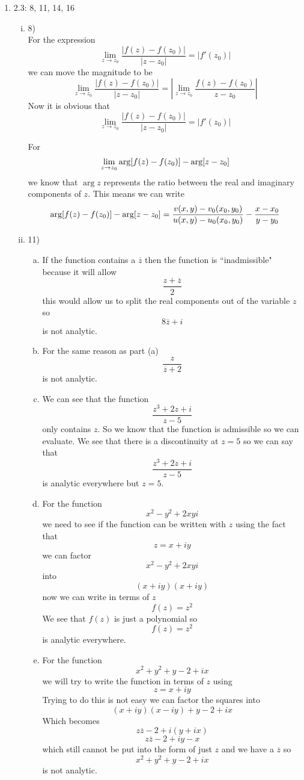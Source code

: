 \documentclass[11pt]{article}
\newcommand{\zbar}{\overline{z}}
\newcommand{\Arg}{\textnormal{arg}}
\begin{document}
\begin{enumerate}
\item 2.3:  8, 11, 14, 16
\begin{enumerate}[(i)]
\item 8)\\
For the expression
$$\lim_{z\rightarrow z_0}\frac{|f(z)-f(z_0)|}{|z-z_0|} = |f'(z_0)|$$
we can move the magnitude to be
$$\lim_{z\rightarrow z_0}\frac{|f(z)-f(z_0)|}{|z-z_0|} = \left|\lim_{z\rightarrow z_0}\frac{f(z)-f(z_0)}{z-z_0}\right|$$
Now it is obvious that 
$$\lim_{z\rightarrow z_0}\frac{|f(z)-f(z_0)|}{|z-z_0|} = |f'(z_0)|$$

For
$$\lim_{z\rightarrow z_0} \Arg[f(z) - f(z_0)] -\Arg[z -z_0]$$
we know that $\arg z$ represents the ratio between the real and imaginary components of $z$. This means we can write
$$\Arg[f(z) - f(z_0)] -\Arg[z-z_0]= \frac{v(x,y) - v_0(x_0,y_0)}{u(x,y) - u_0(x_0,y_0)} -\frac{x -x_0}{y-y_0}$$
\item 11)
\begin{enumerate}[(a)]
\item
If the function contains a $\zbar$ then the function is ``inadmissible" because it will allow $$\frac{z+\zbar}{2}$$
this would allow us to split the real components out of the variable $z$ so
$$8\zbar +i$$
is not analytic.
\item
For the same reason as part (a) 
$$\frac{z}{\zbar + 2}$$
is not analytic.
\item
We can see that the function 
$$\frac{z^3+2z+i}{z-5}$$
only contains $z$. So we know that the function is admissible so we can evaluate. We see that there is a discontinuity at $z=5$ so we can say that 
$$\frac{z^3+2z+i}{z-5}$$
is analytic everywhere but $z=5$.
\item
For the function
$$x^2-y^2 +2xyi$$
we need to see if the function can be written with $z$ using the fact that $$z=x+iy$$
we can factor 
$$x^2-y^2 +2xyi$$
into
$$(x+iy)(x+iy)$$
now we can write in terms of $z$
$$f(z)=z^2$$
We see that $f(z)$ is just a polynomial so 
$$f(z)=z^2$$
is analytic everywhere.

\item
For the function 
$$x^2+y^2+y-2+ix$$
we will try to write the function in terms of $z$ using $$z=x+iy$$
Trying to do this is not easy we can factor the squares into
$$(x+iy)(x-iy)+y-2+ix$$
Which becomes
$$z\zbar-2+i(y+ix)$$
$$z\zbar-2+iy-x$$
which still cannot be put into the form of just $z$ and we have a $\zbar$ so 
$$x^2+y^2+y-2+ix$$
is not analytic.


\end{enumerate}
\end{enumerate}
\end{enumerate}
\end{document}
